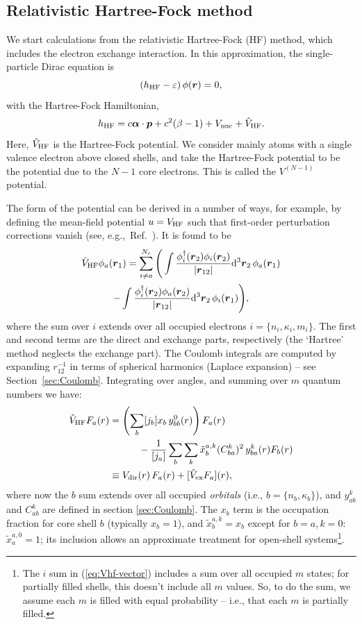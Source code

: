 \documentclass[10pt,twocolumn,a4paper]{article}%
\renewcommand{\v}[1]{\ensuremath{\boldsymbol{#1}}}		%
\newcommand{\be}{\begin{equation}}
\newcommand{\ee}{\end{equation}}
\def\d{\ensuremath{{\rm d}}}
\def\en{\ensuremath{\varepsilon}}
\renewcommand{\k}{\ensuremath{\kappa}}
\begin{document}
\subsection{Relativistic Hartree-Fock method}

We start calculations from the relativistic Hartree-Fock (HF) method, which includes the electron exchange interaction.
In this approximation, the single-particle Dirac equation is
\be\label{eq:HF}
\left(h_{\rm HF} - \en\right) \phi(\v{r}) = 0,
\ee
with the Hartree-Fock Hamiltonian,
\be\label{eq:H-HF}
h_{\rm HF}  = c \v{\alpha}\cdot\v{p} + c^2(\beta-1) +  V_{\rm nuc} +  \hat V_{\rm HF}.
\ee
Here, $\hat V_{\rm HF}$ is the Hartree-Fock potential.
We consider mainly atoms with a single valence electron above closed shells, and take the Hartree-Fock potential to be the potential due to the $N-1$ core electrons.
This is called the $V^{(N-1)}$ potential. 

The form of the potential can be derived in a number of ways, for example, by defining the mean-field potential $u=V_{\rm HF}$ such that first-order perturbation corrections vanish (see, e.g.,~Ref.~\cite{JohnsonBook2007}).
It is found to be
\begin{multline}\label{eq:Vhf-vector}
\hat V_{\rm HF}\phi_a(\v{r}_1) = \sum_{i\neq a}^{N_c}\Bigg(
\int \frac{\phi_i^\dag(\v{r}_2)\phi_i(\v{r}_2)}{|\v{r}_{12}|}\d^3\v{r}_2\,\phi_a(\v{r}_1)\\
-\int \frac{\phi_i^\dag(\v{r}_2)\phi_a(\v{r}_2)}{|\v{r}_{12}|}\d^3\v{r}_2\,\phi_i(\v{r}_1)
\Bigg),
\end{multline}
where the sum over $i$ extends over all occupied electrons $i=\{n_i,\k_i,m_i\}$.
The first and second terms are the direct and exchange parts, respectively (the `Hartree' method neglects the exchange part).
The Coulomb integrals are computed by expanding ${r}_{12}^{-1}$ in terms of spherical harmonics (Laplace expansion) -- see Section~\ref{sec:Coulomb}.
Integrating over angles, and summing over $m$ quantum numbers we have:
\begin{align}
\label{eq:Vhf-radial}
\hat V_{\rm HF}F_a(r)& = \left(\sum_b [j_b] x_b  \,  y^0_{bb}(r)\right)F_a(r)
\notag \\  & \qquad\quad
-\frac{1}{[j_a]}\sum_b \sum_k \tilde x_b^{a,k}(C^k_{ba})^2\, y^k_{ba}(r) F_b(r)  \\
\label{eq:Vhf}
&\equiv V_{\rm dir}(r)\,F_a(r) + [\hat V_{\rm ex}F_a](r),
\end{align}
where now the $b$ sum extends over all occupied {\em orbitals} (i.e., $b=\{n_b,\k_b\}$), and 
$y_{ab}^k$  and $C^k_{ab}$ are defined in section \ref{sec:Coulomb}.
The $x_b$ term is the occupation fraction for core shell $b$ (typically $x_b=1$), and
$\tilde x^{a,k}_b = x_b$ except for $b=a$,\,$k=0$: $\tilde x^{a,0}_a = 1$; its inclusion allows an approximate treatment for open-shell systems\footnote{The $i$ sum in (\ref{eq:Vhf-vector}) includes a sum over all occupied $m$ states; for partially filled shells, this doesn't include all $m$ values. So, to do the sum, we assume each $m$ is filled with equal probability -- i.e., that each $m$ is partially filled.}.
\end{document}
